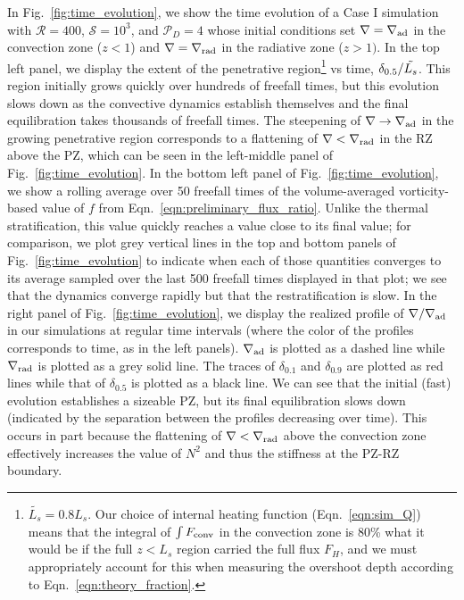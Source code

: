 \documentclass{aastex631}
\newcommand{\gradrad}{\ensuremath{\nabla_{\rm{rad}}}}
\newcommand{\gradad}{\ensuremath{\nabla_{\rm{ad}}}}
\newcommand{\justgrad}{\ensuremath{\nabla}}
\newcommand{\Fconv}{\ensuremath{F_{\rm{conv}}}}
\newcommand{\mP}{\ensuremath{\mathcal{P}}}
\newcommand{\mR}{\ensuremath{\mathcal{R}}}
\newcommand{\mS}{\ensuremath{\mathcal{S}}}
\begin{document}
In Fig.~\ref{fig:time_evolution}, we show the time evolution of a Case I simulation with $\mR = 400$, $\mS = 10^3$, and $\mP_D = 4$ whose initial conditions set $\justgrad = \gradad$ in the convection zone ($z < 1$) and $\justgrad = \gradrad$ in the radiative zone ($z > 1)$.
In the top left panel, we display the extent of the penetrative region\footnote{$\tilde{L_s} = 0.8L_s$. Our choice of internal heating function (Eqn.~\ref{eqn:sim_Q}) means that the integral of $\int\Fconv$ in the convection zone is 80\% what it would be if the full $z < L_s$ region carried the full flux $F_H$, and we must appropriately account for this when measuring the overshoot depth according to Eqn.~\ref{eqn:theory_fraction}.} vs time, $\delta_{\rm{0.5}}/\tilde{L_s}$.
This region initially grows quickly over hundreds of freefall times, but this evolution slows down as the convective dynamics establish themselves and the final equilibration takes thousands of freefall times.
The steepening of $\justgrad\rightarrow\gradad$ in the growing penetrative region corresponds to a flattening of $\justgrad < \gradrad$ in the RZ above the PZ, which can be seen in the left-middle panel of Fig.~\ref{fig:time_evolution}.
In the bottom left panel of Fig.~\ref{fig:time_evolution}, we show a rolling average over 50 freefall times of the volume-averaged vorticity-based value of $f$ from Eqn.~\ref{eqn:preliminary_flux_ratio}.
Unlike the thermal stratification, this value quickly reaches a value close to its final value; for comparison, we plot grey vertical lines in the top and bottom panels of Fig.~\ref{fig:time_evolution} to indicate when each of those quantities converges to its average sampled over the last 500 freefall times displayed in that plot; we see that the dynamics converge rapidly but that the restratification is slow.
In the right panel of Fig.~\ref{fig:time_evolution}, we display the realized profile of $\justgrad/\gradad$ in our simulations at regular time intervals (where the color of the profiles corresponds to time, as in the left panels).
$\gradad$ is plotted as a dashed line while $\gradrad$ is plotted as a grey solid line.
The traces of $\delta_{0.1}$ and $\delta_{0.9}$ are plotted as red lines while that of $\delta_{0.5}$ is plotted as a black line.
We can see that the initial (fast) evolution establishes a sizeable PZ, but its final equilibration slows down (indicated by the separation between the profiles decreasing over time).
This occurs in part because the flattening of $\justgrad < \gradrad$ above the convection zone effectively increases the value of $N^2$ and thus the stiffness at the PZ-RZ boundary.
\end{document}
